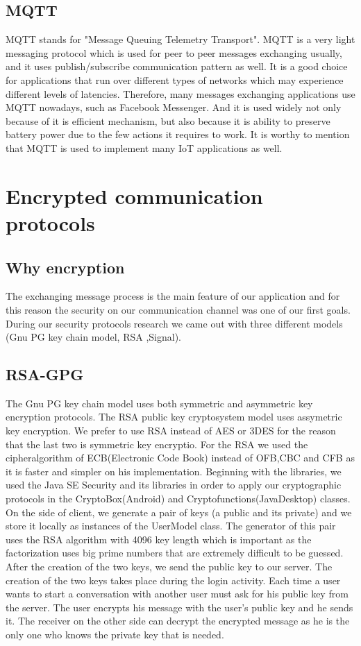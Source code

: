\documentclass[11pt,a4paper]{report}
\begin{document}
\subsection{MQTT}
MQTT stands for "Message Queuing Telemetry Transport". MQTT is a very light messaging protocol which is used for peer to peer messages exchanging usually, and it uses publish/subscribe communication pattern as well. It is a good choice for applications that run over different types of networks which may experience different levels of latencies. Therefore, many messages exchanging applications use MQTT nowadays, such as Facebook Messenger. And it is used widely not only because of it is efficient mechanism, but also because it is ability to preserve battery power due to the few actions it requires to work. It is worthy to mention that MQTT is used to implement many IoT applications as well.


\section{Encrypted communication protocols}

\subsection{Why encryption}
The exchanging message process is the main feature of our application and for this reason the security on our communication channel was one of our first goals. During our security protocols research we came out with three different models (Gnu PG key chain model, RSA ,Signal).

\subsection{RSA-GPG}
The Gnu PG key chain model uses both symmetric and asymmetric key encryption protocols. The RSA public key cryptosystem model uses assymetric key encryption. We prefer to use RSA instead of AES or 3DES for the reason that the last two is symmetric key encryptio. For the RSA we used the cipheralgorithm of ECB(Electronic Code Book) instead of OFB,CBC and CFB as it is faster and simpler on his implementation. Beginning with the libraries, we used the Java SE Security and its libraries in order to apply our cryptographic protocols in the CryptoBox(Android) and Cryptofunctions(JavaDesktop) classes. On the side of client, we generate a pair of keys (a public and its private) and we store it locally as instances of the UserModel class. The generator of this pair uses the RSA algorithm with 4096 key length which is important as the factorization uses big prime numbers that are extremely difficult to be guessed. After the creation of the two keys, we send the public key to our server. The creation of the two keys takes place during the login activity. Each time a user wants to start a conversation with another user must ask for his public key from the server. The user encrypts his message with the user’s public key and he sends it. The receiver on the other side can decrypt the encrypted message as he is the only one who knows the private key that is needed.
\end{document}
